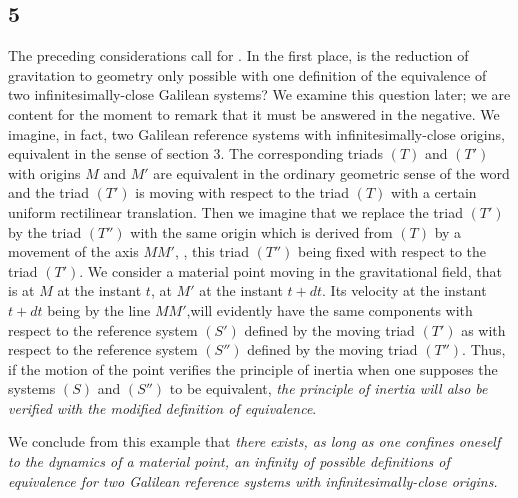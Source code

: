 \subsection*{5}
The preceding considerations call for . In the first place, is the reduction of gravitation to geometry only possible with one definition of the equivalence of two infinitesimally-close Galilean systems? We examine this question later; we are content for the moment to remark that it must be answered in the negative. We imagine, in fact, two Galilean reference systems with infinitesimally-close origins, equivalent in the sense of section 3. The corresponding triads $(T)$ and $(T')$ with origins $M$ and $M'$ are equivalent in the ordinary geometric sense of the word and the triad $(T')$ is moving with respect to the triad $(T)$ with a certain uniform rectilinear translation. Then we imagine that we replace the triad $(T')$ by the triad $(T'')$ with the same origin which is derived from $(T)$ by a  movement of the axis $MM'$, , this triad $(T'')$ being fixed with respect to the triad $(T')$. We consider a material point moving in the gravitational field, that is at $M$ at the instant $t$, at $M'$ at the instant $t+dt$. Its velocity at the instant $t+dt$
being  by the line $MM'$,will evidently have the same components with respect to the reference system $(S')$ defined by the moving triad $(T')$ as with respect to the reference system $(S'')$ defined by the moving triad $(T'')$. Thus, if the motion of the point verifies the principle of inertia when one supposes the systems $(S)$ and $(S'')$ to be equivalent, \textit{the principle of inertia will also be verified with the modified definition of equivalence}.

We conclude from this example that \textit{there exists, as long as one confines oneself to the dynamics of a material point, an infinity of possible definitions of equivalence for two Galilean reference systems with infinitesimally-close origins.}
